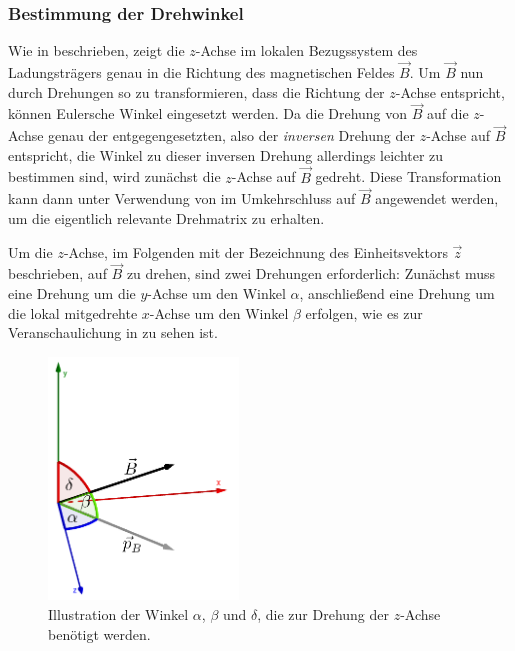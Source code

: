 \subsubsection{Bestimmung der Drehwinkel}
\label{sec:drehwinkel}

Wie in  beschrieben, zeigt die \(z\)-Achse im lokalen Bezugssystem des Ladungstr\"agers genau in die
Richtung des magnetischen Feldes \(\vec{B}\). Um \(\vec{B}\) nun durch Drehungen so zu transformieren, dass die Richtung der
\(z\)-Achse entspricht, k\"onnen Eulersche Winkel eingesetzt werden. Da die Drehung von \(\vec{B}\) auf die \(z\)-Achse genau der
entgegengesetzten, also der \textit{inversen} Drehung der \(z\)-Achse auf \(\vec{B}\) entspricht, die Winkel zu dieser inversen
Drehung allerdings leichter zu bestimmen sind, wird zun\"achst die \(z\)-Achse auf \(\vec{B}\) gedreht. Diese Transformation kann
dann unter Verwendung von  im Umkehrschluss auf \(\vec{B}\) angewendet werden, um die eigentlich relevante
Drehmatrix zu erhalten.

Um die \(z\)-Achse, im Folgenden mit der Bezeichnung des Einheitsvektors \(\vec{z}\) beschrieben, auf \(\vec{B}\) zu drehen, sind
zwei Drehungen erforderlich: Zun\"achst muss eine Drehung um die \(y\)-Achse um den Winkel \(\alpha\), anschlie{\ss}end eine Drehung
um die lokal mitgedrehte \(x\)-Achse um den Winkel \(\beta\) erfolgen, wie es zur Veranschaulichung in  zu sehen
ist.

\begin{figure}[h]
  \centering
  \includegraphics[width=0.45\textwidth]{geogebra/img/winkel_edited}
  \caption{Illustration der Winkel \(\alpha\), \(\beta\) und \(\delta\), die zur Drehung der \(z\)-Achse ben\"otigt werden.}
  \label{fig:winkelfig}
\end{figure}

